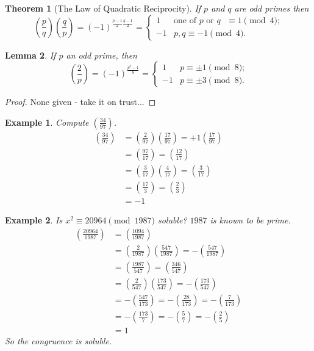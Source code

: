 \documentclass{notes}
\theoremstyle{plain}
\newtheorem{theorem}{Theorem}[chapter]
\newtheorem{lemma}[theorem]{Lemma}
\newtheorem*{example}{Example}
\newcommand{\legsym}[2]{\left( \frac{#1}{#2} \right)}
\begin{document}
\begin{theorem}[The Law of Quadratic Reciprocity]
  If $p$ and $q$ are odd primes then
\[
\legsym{p}{q}\legsym{q}{p} = (-1)^{\frac{p-1}{2}\frac{q-1}{2}} =
\begin{cases}
  1       & \text{one of $p$ or $q$ } \equiv 1 \pmod 4 \text{;}\\
  -1 & p,q \equiv -1 \pmod 4 \text{.}
\end{cases}
\]
\end{theorem}

\begin{lemma}
  If $p$ an odd prime, then
\[
\legsym{2}{p} = (-1)^{\frac{p^2-1}{8}} =
\begin{cases}
  1       & p \equiv \pm 1 \pmod 8 \text{;} \\
  -1 & p \equiv \pm 3 \pmod 8 \text{.}
\end{cases}
\]
\end{lemma}

\begin{proof}
  None given - take it on trust...
\end{proof}

\begin{example}
  Compute $\legsym{34}{97}$.
\begin{align*}
  \legsym{34}{97} &= \legsym{2}{97}\legsym{17}{97} = +1\legsym{17}{97} \\
  &= \legsym{97}{17} = \legsym{12}{17} \\
  &= \legsym{3}{17}\legsym{4}{17} = \legsym{3}{17} \\
  &= \legsym{17}{3} = \legsym{2}{3} \\
  &= -1
\end{align*}
\end{example}

\begin{example}
  Is $x^2 \equiv 20964 \pmod{1987}$ soluble?  $1987$ is known to be
  prime.
\begin{align*}
  \legsym{20964}{1987} & = \legsym{1094}{1987} \\
  & = \legsym{2}{1987}\legsym{547}{1987} = -\legsym{547}{1987} \\
  & = \legsym{1987}{547} = \legsym{346}{547} \\
  & = \legsym{2}{547}\legsym{173}{547} = - \legsym{173}{547} \\
  & = - \legsym{547}{173} = - \legsym{28}{173} = -\legsym{7}{173} \\
  & = - \legsym{173}{7} = -\legsym{5}{7} = -\legsym{2}{5} \\
  & = 1
\end{align*}
So the congruence is soluble.
\end{example}
\end{document}
